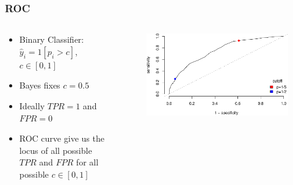\documentclass[
  shownotes,
  xcolor={svgnames},
  hyperref={colorlinks,citecolor=DarkBlue,linkcolor=DarkRed,urlcolor=DarkBlue}
  , aspectratio=169]{beamer}
\begin{document}
\begin{frame}[fragile]
\frametitle{ROC}

\begin{columns}[T] %
\begin{column}{.52\textwidth}
  \begin{itemize}
    \item Binary Classifier: $\hat{y}_i=1[p_i>c]$, $c\in[0,1]$
    \medskip
    \item Bayes fixes $c=0.5$
    \medskip
    \item Ideally $TPR=1$  and $FPR=0$
    \medskip
    \item ROC curve give us the locus of all possible $TPR$ and $FPR$ for all possible $c\in[0,1]$
  \end{itemize}
\end{column}  
\hfill
\begin{column}{.48\textwidth}

 \begin{figure}[H] \centering
            \captionsetup{justification=centering}
              \includegraphics[scale=0.4]{figures/roc}                            
 \end{figure}

\end{column}
\end{columns}

\end{frame}
\end{document}
